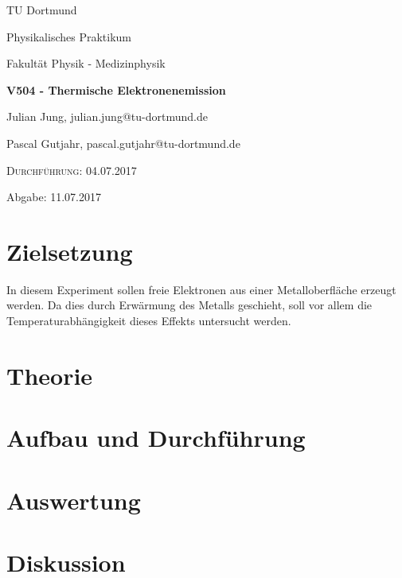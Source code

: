


\begin{titlepage}
  \centering
  {\LARGE TU Dortmund \par}
  \vspace{0.75cm}
  {\Large Physikalisches Praktikum \par}
  \vspace{0.75cm}
  {\Large Fakultät Physik - Medizinphysik \par}
  \vspace{4cm}
  {\LARGE \bfseries V504 - Thermische Elektronenemission \par}
  \vspace{4cm}
  {\large Julian Jung, julian.jung@tu-dortmund.de \par \vspace{0.25cm}
  Pascal Gutjahr, pascal.gutjahr@tu-dortmund.de \par}
  \vspace{6cm}
  {\scshape Durchführung: 04.07.2017 \par \vspace{0.25cm}
  Abgabe: 11.07.2017}
\end{titlepage}
\newpage
\tableofcontents
\newpage
\section{Zielsetzung}
In diesem Experiment sollen freie Elektronen aus einer Metalloberfläche erzeugt werden.
Da dies durch Erwärmung des Metalls geschieht, soll vor allem die Temperaturabhängigkeit
dieses Effekts untersucht werden.
\section{Theorie}
 
\section{Aufbau und Durchführung}
 
\section{Auswertung}
 
\section{Diskussion}
 
\printbibliography

